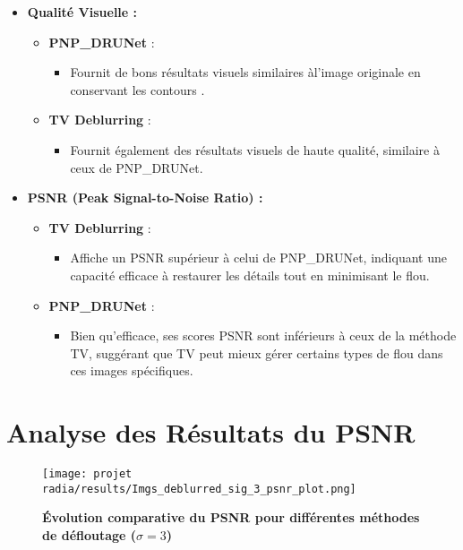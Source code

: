 \documentclass[a4paper, 12pt]{report} %
\begin{document}
\begin{itemize}
    \item \textbf{Qualité Visuelle :}
    \begin{itemize}
        \item \textbf{PNP\_DRUNet} :
        \begin{itemize}
            \item Fournit de bons résultats  visuels similaires àl'image originale en conservant les contours  .
        \end{itemize}
        \item \textbf{TV Deblurring} :
        \begin{itemize}
            \item Fournit également des résultats visuels de haute qualité, similaire à ceux de PNP\_DRUNet.
        \end{itemize}
       
    \end{itemize}

    \item \textbf{PSNR (Peak Signal-to-Noise Ratio) :}
    \begin{itemize}
        \item \textbf{TV Deblurring} :
        \begin{itemize}
            \item Affiche un PSNR supérieur à celui de PNP\_DRUNet, indiquant une capacité efficace à restaurer les détails tout en minimisant le flou.
        \end{itemize}
        \item \textbf{PNP\_DRUNet} :
        \begin{itemize}
            \item Bien qu'efficace, ses scores PSNR sont inférieurs à ceux de la méthode TV, suggérant que TV peut mieux gérer certains types de flou dans ces images spécifiques.
        \end{itemize}
       
    \end{itemize}
\end{itemize}
\section*{Analyse des Résultats du PSNR}
\begin{figure}[H]
    \centering
    \texttt{[image: projet radia/results/Imgs\_deblurred\_sig\_3\_psnr\_plot.png]}
    \caption{ \textbf{Évolution comparative du PSNR pour différentes méthodes de défloutage (\(\sigma = 3\))}
 }
    \label{fig:9}
\end{figure} 
\end{document}
